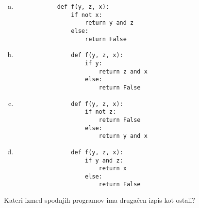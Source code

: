 \documentclass[arhiv, 10pt]{../izpit}
\begin{document}
        \begin{multicols}{2}
        \begin{enumerate}[(a)]
\item 
            \begin{verbatim}
            def f(y, z, x):
                if not x:
                    return y and z
                else:
                    return False
            \end{verbatim}
        
\item 
                \begin{verbatim}
                def f(y, z, x):
                    if y:
                        return z and x
                    else:
                        return False
                \end{verbatim}
            
\item 
                \begin{verbatim}
                def f(y, z, x):
                    if not z:
                        return False
                    else:
                        return y and x
                \end{verbatim}
            
\item 
                \begin{verbatim}
                def f(y, z, x):
                    if y and z:
                        return x
                    else:
                        return False
                \end{verbatim}
            
\end{enumerate}

        \end{multicols}
    
        \naloga*
        
        Kateri izmed spodnjih programov ima drugačen izpis kot ostali?
    
\end{document}
